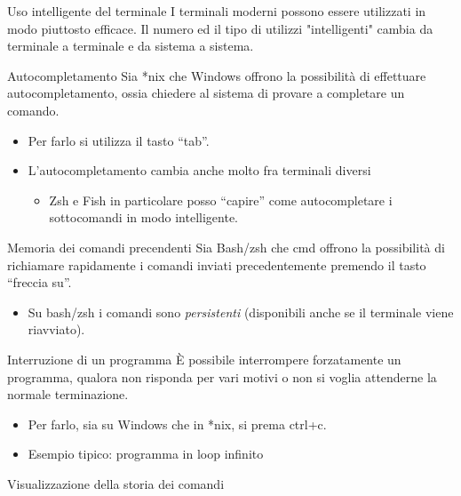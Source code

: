 \documentclass[presentation]{beamer}
\begin{document}
\begin{frame}{Uso intelligente del terminale}
    I terminali moderni possono essere utilizzati in modo piuttosto efficace.
    Il numero ed il tipo di utilizzi "intelligenti" cambia da terminale a terminale e da sistema a sistema.
    \begin{block}{Autocompletamento}
        \scriptsize{}
        Sia *nix che Windows offrono la possibilità di effettuare autocompletamento, ossia chiedere al sistema di provare a completare un comando.
        \begin{itemize}
            \item Per farlo si utilizza il tasto ``tab''.
            \item L'autocompletamento cambia anche molto fra terminali diversi
            \begin{itemize}
                \scriptsize{}
                \item Zsh e Fish in particolare posso ``capire'' come autocompletare i sottocomandi in modo intelligente.
            \end{itemize}
        \end{itemize}
    \end{block}
    \begin{block}{Memoria dei comandi precendenti}
        \scriptsize{}
        Sia Bash/zsh che cmd offrono la possibilità di richiamare rapidamente i comandi inviati precedentemente premendo il tasto ``freccia su''.
        \begin{itemize}
            \item  Su bash/zsh i comandi sono \emph{persistenti} (disponibili anche se il terminale viene riavviato).
        \end{itemize}
    \end{block}
    \begin{block}{Interruzione di un programma}
        \scriptsize{}
        È possibile interrompere forzatamente un programma, qualora non risponda per vari motivi o non si voglia attenderne la normale terminazione.
        \begin{itemize}
            \item Per farlo, sia su Windows che in *nix, si prema ctrl+c.
            \item Esempio tipico: programma in loop infinito
        \end{itemize}
    \end{block}
    \begin{block}{Visualizzazione della storia dei comandi}

\end{block}
\end{frame}
\end{document}

